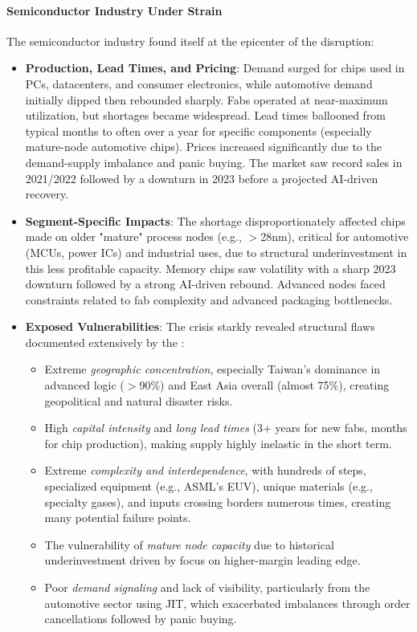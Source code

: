\paragraph{Semiconductor Industry Under Strain}
The semiconductor industry found itself at the epicenter of the disruption:
\begin{itemize}
    \item \textbf{Production, Lead Times, and Pricing}: Demand surged for chips used in PCs, datacenters, and consumer electronics, while automotive demand initially dipped then rebounded sharply. Fabs operated at near-maximum utilization, but shortages became widespread. Lead times ballooned from typical months to often over a year for specific components (especially mature-node automotive chips). Prices increased significantly due to the demand-supply imbalance and panic buying. The market saw record sales in 2021/2022 followed by a downturn in 2023 before a projected AI-driven recovery.
    \item \textbf{Segment-Specific Impacts}: The shortage disproportionately affected chips made on older "mature" process nodes (e.g., \(>\)28nm), critical for automotive (MCUs, power ICs) and industrial uses, due to structural underinvestment in this less profitable capacity. Memory chips saw volatility with a sharp 2023 downturn followed by a strong AI-driven rebound. Advanced nodes faced constraints related to fab complexity and advanced packaging bottlenecks.
    \item \textbf{Exposed Vulnerabilities}: The crisis starkly revealed structural flaws documented extensively by the \textcite{oecd2023semiconductor}:
          \begin{itemize}
              \item Extreme \textit{geographic concentration}, especially Taiwan's dominance in advanced logic (\(>\)90\%) and East Asia overall (almost 75\%), creating geopolitical and natural disaster risks.
              \item High \textit{capital intensity} and \textit{long lead times} (3+ years for new fabs, months for chip production), making supply highly inelastic in the short term.
              \item Extreme \textit{complexity and interdependence}, with hundreds of steps, specialized equipment (e.g., ASML's EUV), unique materials (e.g., specialty gases), and inputs crossing borders numerous times, creating many potential failure points.
              \item The vulnerability of \textit{mature node capacity} due to historical underinvestment driven by focus on higher-margin leading edge.
              \item Poor \textit{demand signaling} and lack of visibility, particularly from the automotive sector using JIT, which exacerbated imbalances through order cancellations followed by panic buying.
          \end{itemize}
\end{itemize}

